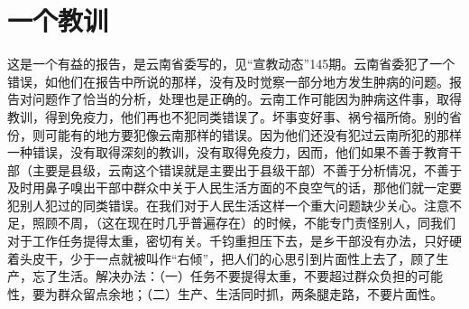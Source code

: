 \section[一个教训（一九五八年十一月二十五日）]{一个教训}


这是一个有益的报告，是云南省委写的，见“宣教动态”145期。云南省委犯了一个错误，如他们在报告中所说的那样，没有及时觉察一部分地方发生肿病的问题。报告对问题作了恰当的分析，处理也是正确的。云南工作可能因为肿病这件事，取得教训，得到免疫力，他们再也不犯同类错误了。坏事变好事、祸兮福所倚。别的省份，则可能有的地方要犯像云南那样的错误。因为他们还没有犯过云南所犯的那样一种错误，没有取得深刻的教训，没有取得免疫力，因而，他们如果不善于教育干部（主要是县级，云南这个错误就是主要出于县级干部）不善于分析情况，不善于及时用鼻子嗅出干部中群众中关于人民生活方面的不良空气的话，那他们就一定要犯别人犯过的同类错误。在我们对于人民生活这样一个重大问题缺少关心。注意不足，照顾不周，（这在现在时几乎普遍存在）的时候，不能专门责怪别人，同我们对于工作任务提得太重，密切有关。千钧重担压下去，是乡干部没有办法，只好硬着头皮干，少于一点就被叫作“右倾”，把人们的心思引到片面性上去了，顾了生产，忘了生活。解决办法：（一）任务不要提得太重，不要超过群众负担的可能性，要为群众留点余地；（二）生产、生活同时抓，两条腿走路，不要片面性。


